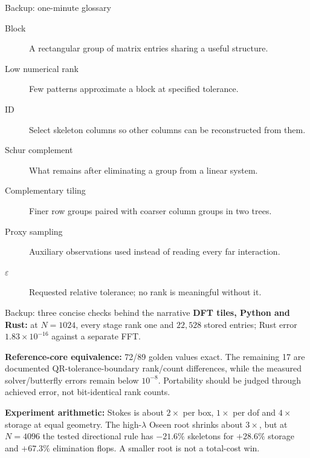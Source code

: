\documentclass[aspectratio=169,11pt]{beamer}
\newcommand{\eps}{\varepsilon}
\begin{document}
\appendix
\begin{frame}{Backup: one-minute glossary}
\begin{description}
 \item[Block] A rectangular group of matrix entries sharing a useful structure.
 \item[Low numerical rank] Few patterns approximate a block at specified tolerance.
 \item[ID] Select skeleton columns so other columns can be reconstructed from them.
 \item[Schur complement] What remains after eliminating a group from a linear system.
 \item[Complementary tiling] Finer row groups paired with coarser column groups in two trees.
 \item[Proxy sampling] Auxiliary observations used instead of reading every far interaction.
 \item[$\eps$] Requested relative tolerance; no rank is meaningful without it.
\end{description}
\end{frame}

\begin{frame}{Backup: three concise checks behind the narrative}
\textbf{DFT tiles, Python and Rust:}
at $N=1024$, every stage rank one and $22{,}528$ stored entries; Rust error $1.83\times10^{-16}$ against a separate FFT.

\vspace{2mm}
\textbf{Reference-core equivalence:}
72/89 golden values exact. The remaining 17 are documented QR-tolerance-boundary rank/count differences, while the measured solver/butterfly errors remain below $10^{-8}$. Portability should be judged through achieved error, not bit-identical rank counts.

\vspace{2mm}
\textbf{Experiment arithmetic:}
Stokes is about $2\times$ per box, $1\times$ per dof and $4\times$ storage at equal geometry. The high-$\lambda$ Oseen root shrinks about $3\times$, but at $N=4096$ the tested directional rule has $-21.6\%$ skeletons for $+28.6\%$ storage and $+67.3\%$ elimination flops. A smaller root is not a total-cost win.
\end{frame}
\end{document}
